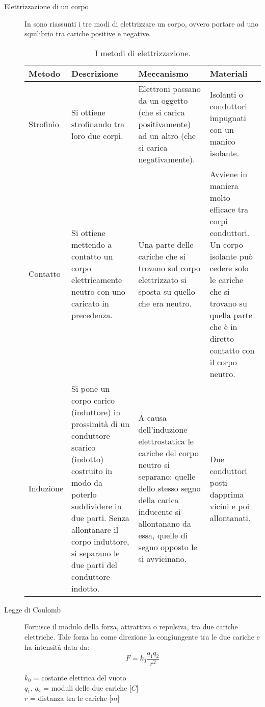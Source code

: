 \documentclass[a4paper,11pt,italian]{article}
\begin{document}
\begin{description}
  \item[Elettrizzazione di un corpo] 
  In  sono riassunti i tre modi di elettrizzare un corpo, ovvero portare ad uno squilibrio tra cariche positive e negative.

\begin{table}[htb]\centering\footnotesize
\begin{tabular}{p{} p{} p{} p{}}\toprule
\textbf{Metodo} & \textbf{Descrizione} & \textbf{Meccanismo} & \textbf{Materiali} \\\midrule
Strofinìo & Si ottiene strofinando tra loro due corpi. & Elettroni passano da un oggetto (che si carica positivamente) ad un altro (che si carica negativamente). & Isolanti o conduttori impugnati con un manico isolante.\\\addlinespace[1em]
Contatto & Si ottiene mettendo a contatto un corpo elettricamente neutro con uno caricato in precedenza. & Una parte delle cariche che si trovano sul corpo elettrizzato si sposta su quello che era neutro. & Avviene in maniera molto efficace tra corpi conduttori. Un corpo isolante può cedere solo le cariche che si trovano su quella parte che è in diretto contatto con il corpo neutro.\\\addlinespace[1em]
Induzione & Si pone un corpo carico (induttore) in prossimità di un conduttore scarico (indotto) costruito in modo da poterlo suddividere in due parti. Senza allontanare il corpo induttore, si separano le due parti del conduttore indotto. & A causa dell’induzione elettrostatica le cariche del corpo neutro si separano: quelle dello stesso segno della carica inducente si allontanano da essa, quelle di segno opposto le si avvicinano. & Due conduttori posti dapprima vicini e poi allontanati.\\\bottomrule
\end{tabular}
\caption{I metodi di elettrizzazione.}
\label{tab:elettrizzazione}
\end{table}
  
  \item[Legge di Coulomb] 
  Fornisce il modulo della forza, attrattiva o repulsiva, tra due cariche elettriche. Tale forza ha come direzione la congiungente tra le due cariche e ha intensità data da:
  \[ F = k_0 \frac{q_1q_2}{r^2} \]
  \begin{multicols}{2}
  $ k_0 $ = costante elettrica del vuoto\\
  $ q_1 $, $ q_2 $ = moduli delle due cariche [$ C $]\\
  $ r $ = distanza tra le cariche [$ m $]
  \end{multicols}
  

\end{description}
\end{document}
